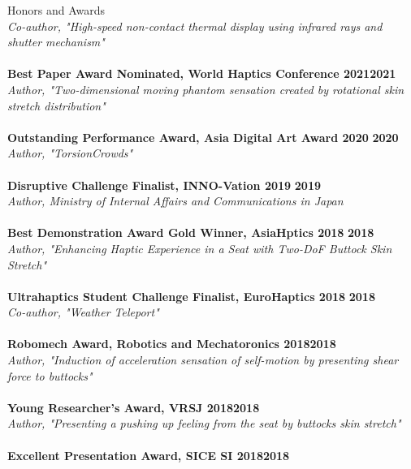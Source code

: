 \documentclass{resume} %
\begin{document}
\begin{rSection}{Honors and Awards}
\\{\em Co-author, "High-speed non-contact thermal display using infrared rays and shutter mechanism"} \\
\\{\bf Best Paper Award Nominated, World Haptics Conference 2021}\hfill {\bf 2021}
\\{\em Author, "Two-dimensional moving phantom sensation created by rotational skin stretch distribution"} \\
\vspace{-3mm}
\\{\bf Outstanding Performance Award, Asia Digital Art Award 2020} \hfill {\bf 2020}
\\{\em Author, "TorsionCrowds"} \\
\vspace{-3mm}
\\{\bf Disruptive Challenge Finalist, INNO-Vation 2019} \hfill {\bf 2019}
\\{\em Author, Ministry of Internal Affairs and Communications in Japan} \\
\vspace{-3mm}
\\{\bf Best Demonstration Award Gold Winner, AsiaHptics 2018} \hfill {\bf 2018}
\\{\em Author, "Enhancing Haptic Experience in a Seat with Two-DoF Buttock Skin Stretch"} \\
\vspace{-3mm}
\\{\bf Ultrahaptics Student Challenge Finalist, EuroHaptics 2018} \hfill {\bf 2018}
\\{\em Co-author, "Weather Teleport"} \\
\vspace{-3mm}
\\{\bf Robomech Award, Robotics and Mechatoronics 2018}\hfill {\bf 2018}
\\{\em Author, "Induction of acceleration sensation of self-motion by presenting shear force to buttocks"} \\
\vspace{-3mm}
\\{\bf Young Researcher's Award, VRSJ 2018}\hfill {\bf 2018}
\\{\em Author, "Presenting a pushing up feeling from the seat by buttocks skin stretch"} \\
\vspace{-3mm}
\\{\bf Excellent Presentation Award, SICE SI 2018}\hfill {\bf 2018}

\end{rSection}
\end{document}
